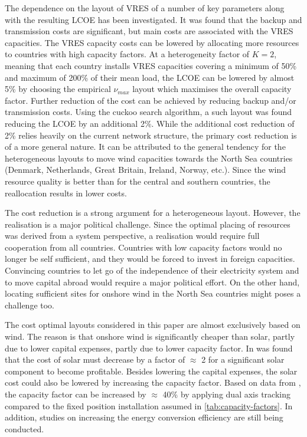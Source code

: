 \documentclass[a4paper, 12pt, sort&compress]{elsarticle}%
\begin{document}
The dependence on the layout of VRES of a number of key parameters
along with the resulting LCOE has been investigated. It was found that
the backup and transmission costs are significant, but main costs are
associated with the VRES capacities. The VRES capacity costs can be
lowered by allocating more resources to countries with high capacity
factors. At a heterogeneity factor of $K = 2$, meaning that each
country installs VRES capacities covering a minimum of 50\% and
maximum of 200\% of their mean load, the LCOE can be lowered by almost
5\% by choosing the empirical $\nu_{max}$ layout which maximises the
overall capacity factor. Further reduction of the cost can be achieved
by reducing backup and/or transmission costs. Using the cuckoo search
algorithm, a such layout was found reducing the LCOE by an additional
2\%. While the additional cost reduction of 2\% relies heavily on the
current network structure, the primary cost reduction is of a more
general nature. It can be attributed to the general tendency for the
heterogeneous layouts to move wind capacities towards the North Sea
countries (Denmark, Netherlands, Great Britain, Ireland, Norway,
etc.). Since the wind resource quality is better than for the central
and southern countries, the reallocation results in lower costs.


The cost reduction is a strong argument for a heterogeneous
layout. However, the realisation is a major political challenge. Since
the optimal placing of resources was derived from a system
perspective, a realisation would require full cooperation from all
countries. Countries with low capacity factors would no longer be self
sufficient, and they would be forced to invest in foreign
capacities. Convincing countries to let go of the independence of
their electricity system and to move capital abroad would require a
major political effort. On the other hand, locating sufficient sites
for onshore wind in the North Sea countries might poses a challenge too.

The cost optimal layouts considered in this paper are almost
exclusively based on wind. The reason is that onshore wind is
significantly cheaper than solar, partly due to lower capital
expenses, partly due to lower capacity factor. In was found that the
cost of solar must decrease by a factor of $\approx$ 2 for a
significant solar component to become profitable. Besides lowering the
capital expenses, the solar cost could also be lowered by increasing
the capacity factor. Based on data from \cite{REA}, the capacity factor can
be increased by $\approx$ 40\% by applying dual axis tracking compared
to the fixed position installation assumed in
\cref{tab:capacity-factors}. In addition, studies on increasing the
energy conversion efficiency are still being conducted.
\end{document}
